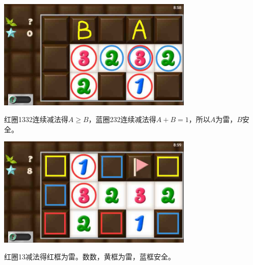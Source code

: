 \subsection{} %
\begin{center}
    \includegraphics[width=0.7\textwidth]{puzzlelow/114-1.jpg}
\end{center}
红圈1332连续减法得$A\ge B$，蓝圈232连续减法得$A+B=1$，所以$A$为雷，$B$安全。
\begin{center}
    \includegraphics[width=0.7\textwidth]{puzzlelow/114-2.jpg}
\end{center}
红圈13减法得红框为雷。数数，黄框为雷，蓝框安全。

